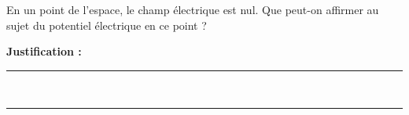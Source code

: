 En un point de l'espace, le champ électrique est nul. Que peut-on affirmer au sujet du potentiel électrique en ce point ?

\choices

\noindent\textbf{Justification :} \hrulefill \\[2.5ex]
\rule{\linewidth}{0.4pt} \\[2.5ex]
\rule{\linewidth}{0.4pt}
\vfill
